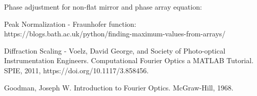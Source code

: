 \documentclass[twoside]{article}
\begin{document}
Phase adjustment for non-flat mirror and phase array equation:



Peak Normalization - Fraunhofer function: https://blogs.bath.ac.uk/python/finding-maximum-values-from-arrays/

Diffraction Scaling - Voelz, David George, and Society of Photo-optical Instrumentation Engineers. Computational Fourier Optics a MATLAB Tutorial. SPIE, 2011, https://doi.org/10.1117/3.858456.








  Goodman, Joseph W. Introduction to Fourier Optics. McGraw-Hill, 1968.

\end{document}

